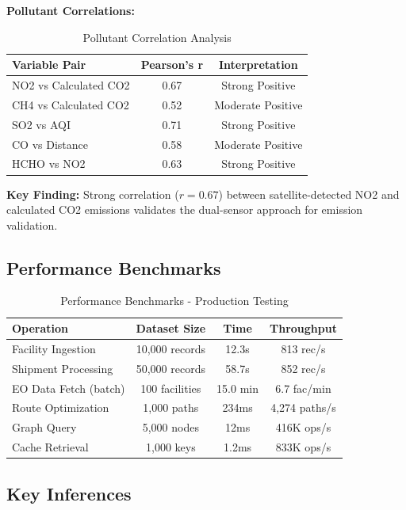 \documentclass[11pt,a4paper]{article}
\begin{document}
\textbf{Pollutant Correlations:}

\begin{table}[H]
\centering
\begin{tabular}{|l|c|c|}
\hline
\textbf{Variable Pair} & \textbf{Pearson's r} & \textbf{Interpretation} \\
\hline
NO2 vs Calculated CO2 & 0.67 & Strong Positive \\
CH4 vs Calculated CO2 & 0.52 & Moderate Positive \\
SO2 vs AQI & 0.71 & Strong Positive \\
CO vs Distance & 0.58 & Moderate Positive \\
HCHO vs NO2 & 0.63 & Strong Positive \\
\hline
\end{tabular}
\caption{Pollutant Correlation Analysis}
\end{table}

\textbf{Key Finding:} Strong correlation ($r = 0.67$) between satellite-detected NO2 and calculated CO2 emissions validates the dual-sensor approach for emission validation.

\subsection{Performance Benchmarks}

\begin{table}[H]
\centering
\small
\begin{tabular}{|l|c|c|c|}
\hline
\textbf{Operation} & \textbf{Dataset Size} & \textbf{Time} & \textbf{Throughput} \\
\hline
Facility Ingestion & 10,000 records & 12.3s & 813 rec/s \\
Shipment Processing & 50,000 records & 58.7s & 852 rec/s \\
EO Data Fetch (batch) & 100 facilities & 15.0 min & 6.7 fac/min \\
Route Optimization & 1,000 paths & 234ms & 4,274 paths/s \\
Graph Query & 5,000 nodes & 12ms & 416K ops/s \\
Cache Retrieval & 1,000 keys & 1.2ms & 833K ops/s \\
\hline
\end{tabular}
\caption{Performance Benchmarks - Production Testing}
\end{table}

\subsection{Key Inferences}
\end{document}
